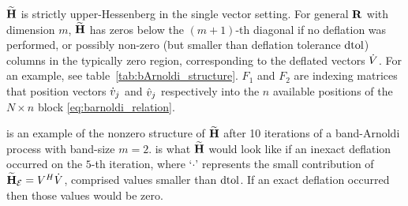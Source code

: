 $\widetilde{\textbf{\textup{H}}}$ is strictly upper-Hessenberg in the single vector setting.  For general $\textbf{\textup{R}}$ with dimension $m$, $\widetilde{\textbf{\textup{H}}}$ has zeros below the $(m+1)$-th diagonal if no deflation was performed, or possibly non-zero (but smaller than deflation tolerance $\text{dtol}$) columns in the typically zero region, corresponding to the deflated vectors $\dot{V}$.  For an example, see table~\ref{tab:bArnoldi_structure}.  $F_1$ and $F_2$ are indexing matrices that position vectors $\dot{v}_j$ and $\hat{v}_j$ respectively into the $n$ available positions of the $N\times n$ block \eqref{eq:barnoldi_relation}.  
 



\begin{table}
\centering
\singlespacing
\subfloat[\label{mat1}]{
$\begin{pmatrix}
 *&*&*&*&*&*&*&*&*&*\\
 *&*&*&*&*&*&*&*&*&*\\
 *&*&*&*&*&*&*&*&*&*\\
  &*&*&*&*&*&*&*&*&*\\
  & &*&*&*&*&*&*&*&*\\
  & & &*&*&*&*&*&*&*\\
  & & & &*&*&*&*&*&*\\
  & & & & &*&*&*&*&*\\
  & & & & & &*&*&*&*\\
 & & & & & & &*&*&*\\
\end{pmatrix}$}
\qquad
\subfloat[\label{mat2}]{
$\begin{pmatrix}
 *&*&*&*&*&*&*&*&*&*\\
 *&*&*&*&*&*&*&*&*&*\\
 *&*&*&*&*&*&*&*&*&*\\
  &*&*&*&*&*&*&*&*&*\\
  & &*&*&*&*&*&*&*&*\\
  & & &*&*&*&*&*&*&*\\
  & & & &\cdot& *&*&*&*&*\\
  & & & & \cdot& &*&*&*&*\\
  & & & &\cdot & & &*&*&*\\
 & & & & \cdot& & & &*&*\\
\end{pmatrix}$ }
\caption{\label{tab:bArnoldi_structure}  is an example of the nonzero structure of $\widetilde{\textbf{\textup{H}}}$ after 10 iterations of a band-Arnoldi process with band-size $m=2$.    is what $\widetilde{\textbf{\textup{H}}}$ would look like if an inexact deflation occurred on the $5$-th iteration, where `$\cdot$' represents the small contribution of $\widetilde{\textbf{\textup{H}}}_\mathcal{E}=V^H\dot{V}$, comprised values smaller than $\text{dtol}$. If an exact deflation occurred then those values would be zero.}
\end{table}

